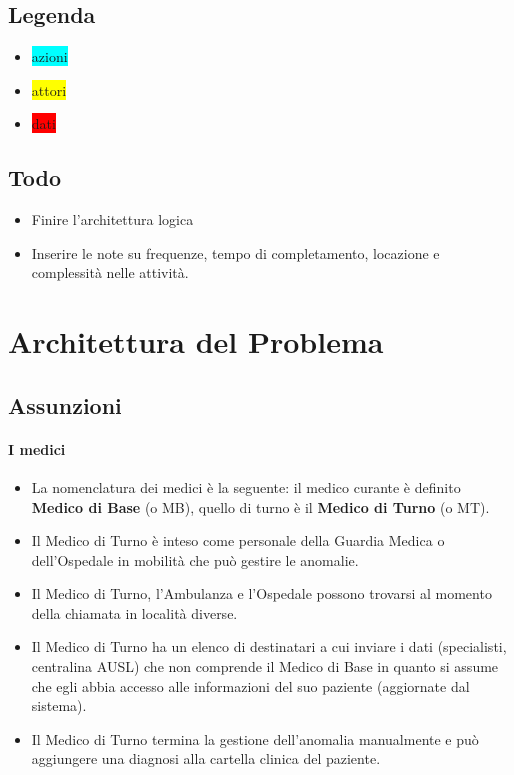 \documentclass[a4paper,11pt,oneside, table]{article}
\begin{document}
\subsection{Legenda}

\begin{itemize}
  \item \colorbox{cyan}{azioni}
  \item \colorbox{yellow}{attori}
  \item \colorbox{red}{dati}
\end{itemize}

\subsection{Todo}

\begin{itemize}
  \item Finire l'architettura logica
  \item Inserire le note su frequenze, tempo di completamento, locazione e complessit\`a nelle attivit\`a.
\end{itemize}

\section{Architettura del Problema}

\subsection{Assunzioni}

\paragraph{I medici}
\begin{itemize}
  \item La nomenclatura dei medici \`e la seguente: il medico curante \`e definito \textbf{Medico di Base} (o MB), quello di turno \`e il \textbf{Medico di Turno} (o MT).
  \item Il Medico di Turno \`e inteso come personale della Guardia Medica o dell'Ospedale in mobilit\`a che pu\`o gestire le anomalie.
  \item Il Medico di Turno, l'Ambulanza e l'Ospedale possono trovarsi al momento della chiamata in localit\`a diverse.
  \item Il Medico di Turno ha un elenco di destinatari a cui inviare i dati (specialisti, centralina AUSL) che non comprende il Medico di Base in quanto si assume che egli abbia accesso alle informazioni del suo paziente (aggiornate dal sistema).
  \item Il Medico di Turno termina la gestione dell'anomalia manualmente e pu\`o aggiungere una diagnosi alla cartella clinica del paziente.
\end{itemize}
\end{document}
